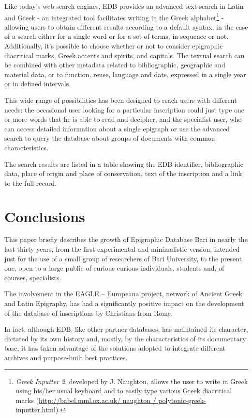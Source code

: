 \documentclass[amsthm,ebook]{saparticle}
\begin{document}
Like today's web search engines, EDB provides an advanced text search in Latin and Greek - an integrated tool
facilitates writing in the Greek alphabet\footnote{ \emph{Greek Inputter 2}, developed by J. Naughton, allows the user to
write in Greek using his/her usual keyboard and to easily type various Greek diacritical marks
(\url{http://babel.mml.ox.ac.uk/ naughton / polytonic-greek-inputter.html}).} - allowing users to obtain different results
according to a default syntax, in the case of a search either for a single word or for a set of terms, in sequence or
not. Additionally, it's possible to choose whether or not to consider epigraphic diacritical marks, Greek accents and
spirits, and capitals. The textual search can be combined with other metadata related to bibliographic, geographic and
material data, or to function, reuse, language and date, expressed in a single year or in defined intervals. 

This wide range of possibilities has been designed to reach users with different needs: the occasional user looking for
a particular inscription could just type one or more words that he is able to read and decipher, and the specialist
user, who can access detailed information about a single epigraph or use the advanced search to query the database
about groups of documents with common characteristics. 

The search results are listed in a table showing the EDB identifier, bibliographic data, place of origin and place of
conservation, text of the inscription and a link to the full record.




\section{Conclusions}


This paper briefly describes the growth of Epigraphic Database Bari in nearly the last thirty years, from the first
experimental and minimalistic version, intended just for the use of a small group of researchers of Bari University, to
the present one, open to a large public of curious curious individuals, students and, of courses, specialists.

The involvement in the EAGLE – Europeana project, network of Ancient Greek and Latin Epigraphy, has had a significantly
positive impact on the development of the database of inscriptions by Christians from Rome. 

In fact, although EDB, like other partner databases, has maintained its character, dictated by its own history and,
mostly, by the characteristics of its documentary base, it has taken advantage of the solutions adopted to integrate
different archives and purpose-built best practices. 
\end{document}
